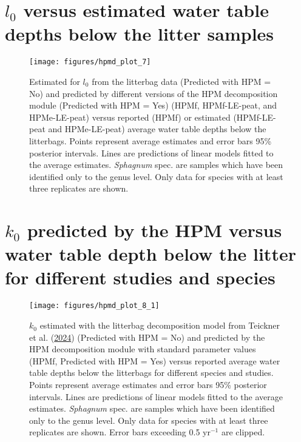 \documentclass[
  12pt,
]{article}
\begin{document}
\hypertarget{sup-6}{%
\section{\texorpdfstring{\(l_0\) versus estimated water table depths below the litter samples}{l\_0 versus estimated water table depths below the litter samples}}\label{sup-6}}



\begin{figure}[H]

{\centering \texttt{[image: figures/hpmd\_plot\_7]} 

}

\caption{Estimated for \(l_0\) from the litterbag data (Predicted with HPM = No) and predicted by different versions of the HPM decomposition module (Predicted with HPM = Yes) (HPMf, HPMf-LE-peat, and HPMe-LE-peat) versus reported (HPMf) or estimated (HPMf-LE-peat and HPMe-LE-peat) average water table depths below the litterbags. Points represent average estimates and error bars 95\% posterior intervals. Lines are predictions of linear models fitted to the average estimates. \emph{Sphagnum} spec. are samples which have been identified only to the genus level. Only data for species with at least three replicates are shown.}\label{fig:sup-hpmd-plot-7}
\end{figure}

\hypertarget{sup-8}{%
\section{\texorpdfstring{\(k_0\) predicted by the HPM versus water table depth below the litter for different studies and species}{k\_0 predicted by the HPM versus water table depth below the litter for different studies and species}}\label{sup-8}}



\begin{figure}[H]

{\centering \texttt{[image: figures/hpmd\_plot\_8\_1]} 

}

\caption{\(k_0\) estimated with the litterbag decomposition model from Teickner et al. (\protect\hyperlink{ref-Teickner.2024f}{2024}) (Predicted with HPM = No) and predicted by the HPM decomposition module with standard parameter values (HPMf, Predicted with HPM = Yes) versus reported average water table depths below the litterbags for different species and studies. Points represent average estimates and error bars 95\% posterior intervals. Lines are predictions of linear models fitted to the average estimates. \emph{Sphagnum} spec. are samples which have been identified only to the genus level. Only data for species with at least three replicates are shown. Error bars exceeding 0.5 yr\(^{-1}\) are clipped.}\label{fig:sup-hpmd-plot-8-1}
\end{figure}
\end{document}
